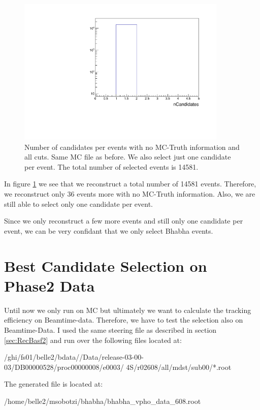 \documentclass[a4paper,11pt,twosided,final,german,openbib,pdftex,listof=totoc,bibliography=totoc]{scrbook}
\begin{document}
\begin{figure}[h!]
	\centering
	\includegraphics[width=10cm]{Cuts/nCandNoMCInfo.pdf}
	\caption[Number Of Candidates Per Event With No MC-Truth Info (All Cuts)]{Number of candidates per events with no MC-Truth information and all cuts. Same MC file as before. We also select just one candidate per event. The total number of selected events is 14581.}
	\label{fig:nCandNoMCInfo}
\end{figure}

In figure \ref{fig:nCandNoMCInfo} we see that we reconstruct a total number of 14581 events. Therefore, we reconstruct only 36 events more with no MC-Truth information. Also, we are still able to select only one candidate per event. 

Since we only reconstruct a few more events and still only one candidate per event, we can be very confidant that we only select Bhabha events.

\section{Best Candidate Selection on Phase2 Data}
\label{sec:SelectingBhabhaData}

Until now we only run on MC but ultimately we want to calculate the tracking efficiency on Beamtime-data. Therefore, we have to test the selection also on Beamtime-Data. I used the same steering file as described in section \ref{sec:RecBasf2} and run over the following files located at:


/ghi/fs01/belle2/bdata//Data/release-03-00-03/DB00000528/proc00000008/e0003/
4S/r02608/all/mdst/sub00/*.root


The generated file is located at:

/home/belle2/msobotzi/bhabha/bhabha\_vpho\_data\_608.root
\end{document}
